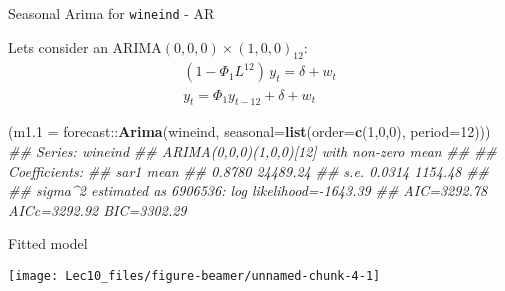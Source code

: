 \documentclass[11pt,ignorenonframetext,]{beamer}
\newenvironment{Shaded}{}{}
\newcommand{\CommentTok}[1]{\textcolor[rgb]{0.38,0.63,0.69}{\textit{#1}}}
\newcommand{\DataTypeTok}[1]{\textcolor[rgb]{0.56,0.13,0.00}{#1}}
\newcommand{\DecValTok}[1]{\textcolor[rgb]{0.25,0.63,0.44}{#1}}
\newcommand{\KeywordTok}[1]{\textcolor[rgb]{0.00,0.44,0.13}{\textbf{#1}}}
\newcommand{\NormalTok}[1]{#1}
\newcommand{\OperatorTok}[1]{\textcolor[rgb]{0.40,0.40,0.40}{#1}}
\let\oldShaded\Shaded
\let\endoldShaded\endShaded
\renewenvironment{Shaded}{\footnotesize\begin{spacing}{0.9}\oldShaded}{\endoldShaded\end{spacing}}
\begin{document}
\begin{frame}[fragile]{Seasonal Arima for \texttt{wineind} - AR}
\protect\hypertarget{seasonal-arima-for---ar}{}

Lets consider an \(\text{ARIMA}(0,0,0) \times (1,0,0)_{12}\): \[
\begin{aligned}
(1-\Phi_1 L^{12}) \, y_t = \delta + w_t \\
y_t = \Phi_1 y_{t-12} + \delta + w_t
\end{aligned}
\] \vspace{2mm}

\begin{Shaded}
\begin{Highlighting}[]
\NormalTok{(}\DataTypeTok{m1.1 =}\NormalTok{ forecast}\OperatorTok{::}\KeywordTok{Arima}\NormalTok{(wineind, }\DataTypeTok{seasonal=}\KeywordTok{list}\NormalTok{(}\DataTypeTok{order=}\KeywordTok{c}\NormalTok{(}\DecValTok{1}\NormalTok{,}\DecValTok{0}\NormalTok{,}\DecValTok{0}\NormalTok{), }\DataTypeTok{period=}\DecValTok{12}\NormalTok{)))}
\CommentTok{## Series: wineind }
\CommentTok{## ARIMA(0,0,0)(1,0,0)[12] with non-zero mean }
\CommentTok{## }
\CommentTok{## Coefficients:}
\CommentTok{##         sar1      mean}
\CommentTok{##       0.8780  24489.24}
\CommentTok{## s.e.  0.0314   1154.48}
\CommentTok{## }
\CommentTok{## sigma^2 estimated as 6906536:  log likelihood=-1643.39}
\CommentTok{## AIC=3292.78   AICc=3292.92   BIC=3302.29}
\end{Highlighting}
\end{Shaded}

\end{frame}

\begin{frame}{Fitted model}
\protect\hypertarget{fitted-model}{}

\begin{center}\texttt{[image: Lec10\_files/figure-beamer/unnamed-chunk-4-1]} \end{center}

\end{frame}
\end{document}

